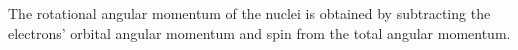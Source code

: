 The rotational angular momentum of the nuclei is obtained by subtracting the electrons' orbital angular momentum and spin from the total angular momentum.
